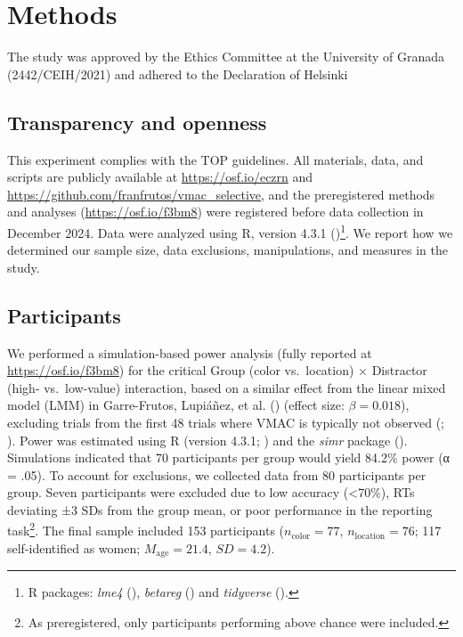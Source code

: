 \documentclass[
  man,
  floatsintext,
  longtable,
  nolmodern,
  notxfonts,
  notimes,
  colorlinks=true,linkcolor=blue,citecolor=blue,urlcolor=blue]{apa7}
\begin{document}
\section{Methods}\label{methods}

The study was approved by the Ethics Committee at the University of
Granada (2442/CEIH/2021) and adhered to the Declaration of Helsinki

\subsection{Transparency and openness}\label{transparency-and-openness}

This experiment complies with the TOP guidelines. All materials, data,
and scripts are publicly available at
\href{https://osf.io/ezcrn}{https://osf.io/eczrn} and
\url{https://github.com/franfrutos/vmac_selective}, and the
preregistered methods and analyses (\url{https://osf.io/f3bm8}) were
registered before data collection in December 2024. Data were analyzed
using R, version 4.3.1 ()\footnote{R packages: \emph{lme4} (), \emph{betareg} () and \emph{tidyverse} ().}. We report how we determined our sample size, data
exclusions, manipulations, and measures in the study.

\subsection{Participants}\label{participants}

We performed a simulation-based power analysis (fully reported at
\url{https://osf.io/f3bm8}) for the critical Group (color vs.~location)
× Distractor (high- vs.~low-value) interaction, based on a similar
effect from the linear mixed model (LMM) in Garre-Frutos, Lupiáñez, et
al. () (effect size:
\(\beta = 0.018\)), excluding trials from the first 48 trials where VMAC
is typically not observed (; ). Power was estimated using R (version 4.3.1;
) and the \emph{simr} package
(). Simulations indicated
that 70 participants per group would yield 84.2\% power (α = .05). To
account for exclusions, we collected data from 80 participants per
group. Seven participants were excluded due to low accuracy
(\textless70\%), RTs deviating ±3 SDs from the group mean, or poor
performance in the reporting task\footnote{As preregistered, only
  participants performing above chance were included.}. The final sample
included 153 participants (\(n_{\text{color}} = 77\),
\(n_{\text{location}} = 76\); 117 self-identified as women;
\(M_{\text{age}} = 21.4\), \(SD = 4.2\)).
\end{document}
